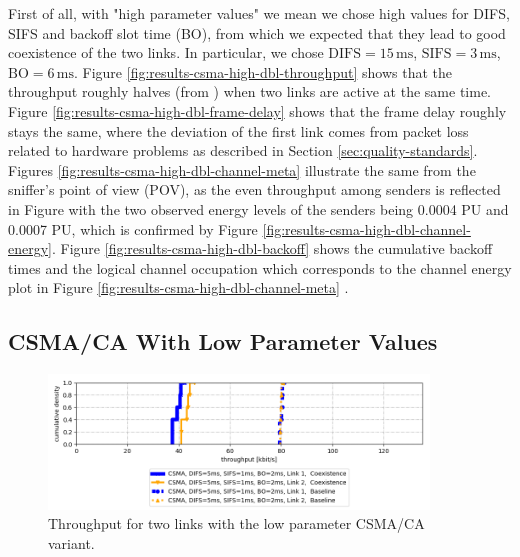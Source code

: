 First of all, with "high parameter values" we mean we chose high values for DIFS, SIFS and backoff slot time (BO), from which we expected that they lead to good coexistence of the two links. In particular, we chose $\text{DIFS}=15 \,\text{ms}$, $\text{SIFS}=3 \,\text{ms}$, $\text{BO}=6 \,\text{ms}$. Figure \ref{fig:results-csma-high-dbl-throughput} shows that the throughput roughly halves (from ) when two links are active at the same time. Figure \ref{fig:results-csma-high-dbl-frame-delay} shows that the frame delay roughly stays the same, where the deviation of the first link comes from packet loss related to hardware problems as described in Section \ref{sec:quality-standards}. Figures \ref{fig:results-csma-high-dbl-channel-meta} illustrate the same from the sniffer's point of view (POV), as the even throughput among senders is reflected in Figure  with the two observed energy levels of the senders being 0.0004 PU and 0.0007 PU, which is confirmed by Figure \ref{fig:results-csma-high-dbl-channel-energy}. Figure \ref{fig:results-csma-high-dbl-backoff} shows the cumulative backoff times and the logical channel occupation which corresponds to the channel energy plot in Figure \ref{fig:results-csma-high-dbl-channel-meta} . 

\clearpage

\subsection{CSMA/CA With Low Parameter Values}
\label{sec:csma-dbl-low}

\begin{figure}[tb]
	\label{fig:results-csma-low-dbl-throughput}
	\begin{center}
		\includegraphics[width=0.9\textwidth]{pictures/results/same_combinations/csma_low_params/throughput_cdf}
	\end{center}
	\caption{Throughput for two links with the low parameter CSMA/CA variant.}
\end{figure}

